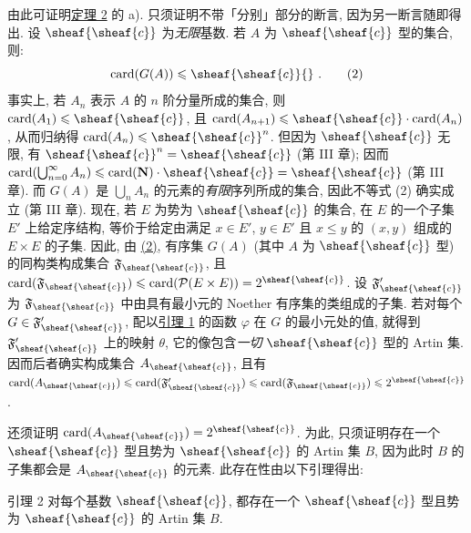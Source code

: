 由此\pageoriginale 可证明\hyperlink{sga4.exp.I.appendix.II.sec.6.theorem.2}{定理 2} 的 a). 只须证明不带「分别」部分的断言, 因为另一断言随即得出. 设 $\sheaf{\sheaf{c}}$ 为\emph{无限}基数. 若 $A$ 为 $\sheaf{\sheaf{c}}$ 型的集合, 则:
\hypertarget{sga4.exp.I.appendix.II.sec.6.theorem.2.proof.equation.2}{}
\begin{equation}
\card(G(A))\leq \sheaf{\sheaf{c}}{\quoi}%
\ .\tag{2}
\end{equation}
事实上, 若 $A_n$ 表示 $A$ 的 $n$ 阶分量所成的集合, 则 $\card(A_1)\leq \sheaf{\sheaf{c}}$, 且 $\card(A_{n+1})\leq\sheaf{\sheaf{c}}\cdot \card(A_n)$, 从而归纳得 $\card(A_n)\leq\sheaf{\sheaf{c}}^n$. 但因为 $\sheaf{\sheaf{c}}$ 无限, 有 $\sheaf{\sheaf{c}}^n=\sheaf{\sheaf{c}}$ (第 III 章); 因而 $\card(\bigcup^\infty_{n=0} A_n)\leq\card(\NN)\cdot \sheaf{\sheaf{c}}=\sheaf{\sheaf{c}}$ (第 III 章). 而 $G(A)$ 是 $\bigcup_n A_n$ 的元素的\emph{有限}序列所成的集合, 因此不等式 (2) 确实成立 (第 III 章). 现在, 若 $E$ 为势为 $\sheaf{\sheaf{c}}$ 的集合, 在 $E$ 的一个子集 $E'$ 上给定序结构, 等价于给定由满足 $x\in E'$, $y\in E'$ 且 $x\leq y$ 的 $(x,y)$ 组成的 $E\times E$ 的子集. 因此, 由 \hyperlink{sga4.exp.I.appendix.II.sec.6.theorem.2.proof.equation.2}{(2)}, 有序集 $G(A)$ (其中 $A$ 为 $\sheaf{\sheaf{c}}$ 型) 的同构类构成集合 $\mathfrak{F}_{\sheaf{\sheaf{c}}}$, 且 $\card(\mathfrak{F}_{\sheaf{\sheaf{c}}})\leq\card(\mathcal{P}(E\times E))=2^{\sheaf{\sheaf{c}}}$. 设 $\mathfrak{F}'_{\sheaf{\sheaf{c}}}$ 为 $\mathfrak{F}_{\sheaf{\sheaf{c}}}$ 中由具有最小元的 Noether 有序集的类组成的子集. 若对每个 $G\in\mathfrak{F}'_{\sheaf{\sheaf{c}}}$, 配以\hyperlink{sga4.exp.I.appendix.II.sec.6.lemma.1}{引理 1} 的函数 $\varphi$ 在 $G$ 的最小元处的值, 就得到 $\mathfrak{F}'_{\sheaf{\sheaf{c}}}$ 上的映射 $\theta$, 它的像包含\emph{一切} $\sheaf{\sheaf{c}}$ 型的 Artin 集. 因而后者确实构成集合 $A_{\sheaf{\sheaf{c}}}$, 且有 $\card(A_{\sheaf{\sheaf{c}}})\leq\card(\mathfrak{F}'_{\sheaf{\sheaf{c}}})\leq\card(\mathfrak{F}_{\sheaf{\sheaf{c}}})\leq2^{\sheaf{\sheaf{c}}}$.

还须\pageoriginale 证明 $\card(A_{\sheaf{\sheaf{c}}})=2^{\sheaf{\sheaf{c}}}$. 为此, 只须证明存在一个 $\sheaf{\sheaf{c}}$ 型且势为 $\sheaf{\sheaf{c}}$ 的 Artin 集 $B$, 因为此时 $B$ 的子集都会是 $A_{\sheaf{\sheaf{c}}}$ 的元素. 此存在性由以下引理得出:



\hypertarget{sga4.exp.I.appendix.II.sec.6.lemma.2}{}
\begin{enonce*}{引理 2}
对每个基数 $\sheaf{\sheaf{c}}$, 都存在一个 $\sheaf{\sheaf{c}}$ 型且势为 $\sheaf{\sheaf{c}}$ 的 Artin 集 $B$.
\end{enonce*}


